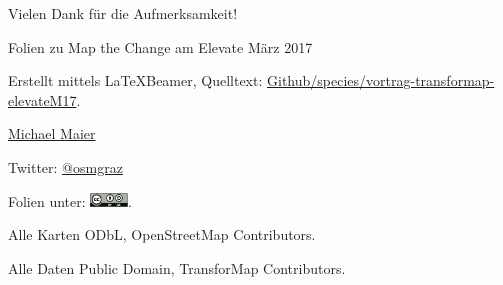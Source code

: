 \documentclass{beamer}
\begin{document}
\begin{frame}{Vielen Dank für die Aufmerksamkeit!}

  Folien zu Map the Change am Elevate März 2017
\vspace{0.8cm}

Erstellt mittels \LaTeX Beamer, Quelltext: \href{https://github.com/species/vortrag-transformap-elevateM17}{Github/species/vortrag-transformap-elevateM17}.
\vspace{0.8cm}

\href{mailto:michael.maier@mailbox.org}{Michael Maier}

Twitter: \href{https://twitter.com/osmgraz}{@osmgraz}
\vspace{0.8cm}

Folien unter: \includegraphics[width=1cm]{cc-by-sa.pdf}. 

Alle Karten ODbL, OpenStreetMap Contributors.

Alle Daten Public Domain, TransforMap Contributors.

\vspace{0.8cm}


\end{frame}
\end{document}
